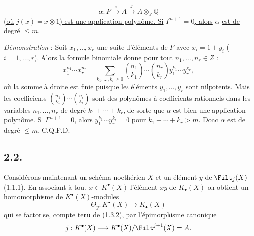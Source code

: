 
\[
\alpha:P\xrightarrow{i}A\xrightarrow{j}A\otimes_{\mathbb Z}\mathbb Q
\]
\uline{(où} $j(x)=x\otimes1$\uline{) est une application polynôme. Si} $I^{m+1}=0$\uline{, alors} $\alpha$ \uline{est de degré} $\leq m$.

\emph{Démonstration} : Soit $x_1,\ldots,x_r$ une suite d'éléments de $F$ avec $x_i=1+y_i$ ($i=1,\ldots,r$). Alors la formule binomiale donne pour tout $n_1,\ldots,n_r\in Z$ :
\begin{equation}\tag{2.1.5}
x_1^{n_1}\cdots x_r^{n_r}=
\sum_{k_1,\ldots,k_r\geq0}\binom{n_1}{k_1}\cdots\binom{n_r}{k_r}y_1^{k_1}\cdots y_r^{k_r},
\end{equation}
où la somme à droite est finie puisque les éléments $y_1,\ldots,y_r$ sont nilpotents. Mais les coefficients $\binom{n_1}{k_1}\cdots\binom{n_r}{k_r}$ sont des polynômes à coefficients rationnels dans les variables $n_1,\ldots,n_r$ de degré $k_1+\cdots+k_r$, de sorte que $\alpha$ est bien une application polynôme. Si $I^{m+1}=0$, alors $y_1^{k_1}\cdots y_r^{k_r}=0$ pour $k_1+\cdots+k_r>m$. Donc $\alpha$ est de degré $\leq m$, C.Q.F.D.

\subsection*{2.2.}
Considérons maintenant un schéma noethérien $X$ et un élément $y$ de $\Filt_j(X)$ (1.1.1). En associant à tout $x\in K^{\bullet}(X)$ l'élément $xy$ de $K_\bullet(X)$ on obtient un homomorphisme de $K^{\bullet}(X)$-modules
\[
\Theta_y:K^{\bullet}(X)\longrightarrow K_\bullet(X)
\]
qui se factorise, compte tenu de (1.3.2), par l'épimorphisme canonique
\[
j:K^{\bullet}(X)\longrightarrow K^{\bullet}(X)/\Filt^{j+1}(X)=A.
\]
